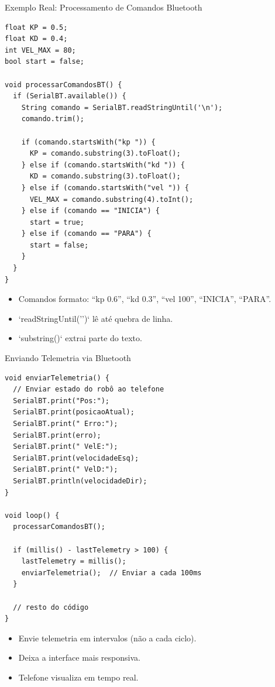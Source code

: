 \documentclass[10pt]{beamer}
\begin{document}
\begin{frame}[fragile]{Exemplo Real: Processamento de Comandos Bluetooth}
\begin{lstlisting}
float KP = 0.5;
float KD = 0.4;
int VEL_MAX = 80;
bool start = false;

void processarComandosBT() {
  if (SerialBT.available()) {
    String comando = SerialBT.readStringUntil('\n');
    comando.trim();

    if (comando.startsWith("kp ")) {
      KP = comando.substring(3).toFloat();
    } else if (comando.startsWith("kd ")) {
      KD = comando.substring(3).toFloat();
    } else if (comando.startsWith("vel ")) {
      VEL_MAX = comando.substring(4).toInt();
    } else if (comando == "INICIA") {
      start = true;
    } else if (comando == "PARA") {
      start = false;
    }
  }
}
\end{lstlisting}

  \begin{itemize}
    \item Comandos formato: ``kp 0.6'', ``kd 0.3'', ``vel 100'', ``INICIA'', ``PARA''.
    \item `readStringUntil('\n')` lê até quebra de linha.
    \item `substring()` extrai parte do texto.
  \end{itemize}
\end{frame}

\begin{frame}[fragile]{Enviando Telemetria via Bluetooth}
\begin{lstlisting}
void enviarTelemetria() {
  // Enviar estado do robô ao telefone
  SerialBT.print("Pos:");
  SerialBT.print(posicaoAtual);
  SerialBT.print(" Erro:");
  SerialBT.print(erro);
  SerialBT.print(" VelE:");
  SerialBT.print(velocidadeEsq);
  SerialBT.print(" VelD:");
  SerialBT.println(velocidadeDir);
}

void loop() {
  processarComandosBT();
  
  if (millis() - lastTelemetry > 100) {
    lastTelemetry = millis();
    enviarTelemetria();  // Enviar a cada 100ms
  }
  
  // resto do código
}
\end{lstlisting}

  \begin{itemize}
    \item Envie telemetria em intervalos (não a cada ciclo).
    \item Deixa a interface mais responsiva.
    \item Telefone visualiza em tempo real.
  \end{itemize}
\end{frame}
\end{document}
